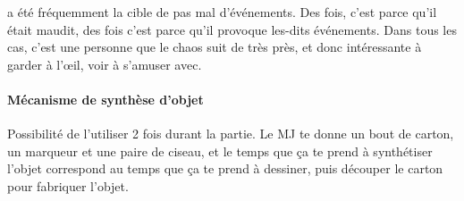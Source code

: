 {	\par \nmPlayerXI a été fréquemment la cible de pas mal d'événements. Des fois, c'est parce qu'il était maudit, des fois c'est parce qu'il provoque les-dits événements. Dans tous les cas, c'est une personne que le chaos suit de très près, et donc intéressante à garder à l'œil, voir à s'amuser avec.
	
	\paragraph{Mécanisme de synthèse d'objet} Possibilité de l'utiliser 2 fois durant la partie. Le MJ te donne un bout de carton, un marqueur et une paire de ciseau, et le temps que ça te prend à synthétiser l'objet correspond au temps que ça te prend à dessiner, puis découper le carton pour fabriquer l'objet.
}






